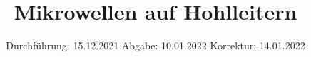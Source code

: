 

\subject{V53}
\title{Mikrowellen auf Hohlleitern}
\date{%
  Durchführung: 15.12.2021
  \hspace{3em}
  Abgabe: 10.01.2022 
\hspace{3em}
  Korrektur: 14.01.2022
}



\maketitle
\thispagestyle{empty}
\tableofcontents
\newpage







\printbibliography{}


